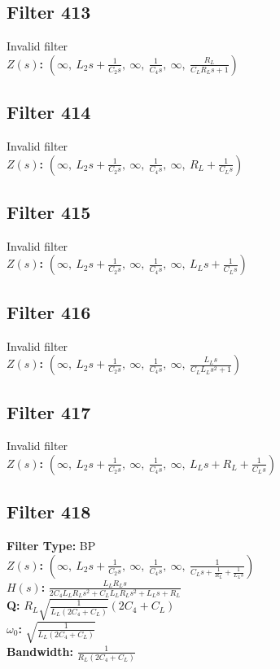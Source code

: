 \documentclass{article}
\begin{document}
\subsection*{Filter 413}
Invalid filter \\ 
\textbf{$Z(s)$:} $\left( \infty, \  L_{2} s + \frac{1}{C_{2} s}, \  \infty, \  \frac{1}{C_{4} s}, \  \infty, \  \frac{R_{L}}{C_{L} R_{L} s + 1}\right)$ \\ 
\subsection*{Filter 414}
Invalid filter \\ 
\textbf{$Z(s)$:} $\left( \infty, \  L_{2} s + \frac{1}{C_{2} s}, \  \infty, \  \frac{1}{C_{4} s}, \  \infty, \  R_{L} + \frac{1}{C_{L} s}\right)$ \\ 
\subsection*{Filter 415}
Invalid filter \\ 
\textbf{$Z(s)$:} $\left( \infty, \  L_{2} s + \frac{1}{C_{2} s}, \  \infty, \  \frac{1}{C_{4} s}, \  \infty, \  L_{L} s + \frac{1}{C_{L} s}\right)$ \\ 
\subsection*{Filter 416}
Invalid filter \\ 
\textbf{$Z(s)$:} $\left( \infty, \  L_{2} s + \frac{1}{C_{2} s}, \  \infty, \  \frac{1}{C_{4} s}, \  \infty, \  \frac{L_{L} s}{C_{L} L_{L} s^{2} + 1}\right)$ \\ 
\subsection*{Filter 417}
Invalid filter \\ 
\textbf{$Z(s)$:} $\left( \infty, \  L_{2} s + \frac{1}{C_{2} s}, \  \infty, \  \frac{1}{C_{4} s}, \  \infty, \  L_{L} s + R_{L} + \frac{1}{C_{L} s}\right)$ \\ 
\subsection*{Filter 418}
\textbf{Filter Type:} BP \\ 
\textbf{$Z(s)$:} $\left( \infty, \  L_{2} s + \frac{1}{C_{2} s}, \  \infty, \  \frac{1}{C_{4} s}, \  \infty, \  \frac{1}{C_{L} s + \frac{1}{R_{L}} + \frac{1}{L_{L} s}}\right)$ \\ 
\textbf{$H(s)$:} $\frac{L_{L} R_{L} s}{2 C_{4} L_{L} R_{L} s^{2} + C_{L} L_{L} R_{L} s^{2} + L_{L} s + R_{L}}$ \\ 
\textbf{Q:} $R_{L} \sqrt{\frac{1}{L_{L} \left(2 C_{4} + C_{L}\right)}} \left(2 C_{4} + C_{L}\right)$ \\ 
\textbf{$\omega_0$:} $\sqrt{\frac{1}{L_{L} \left(2 C_{4} + C_{L}\right)}}$ \\ 
\textbf{Bandwidth:} $\frac{1}{R_{L} \left(2 C_{4} + C_{L}\right)}$ \\ 
\end{document}
